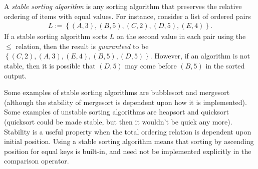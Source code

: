\documentclass[12pt]{article}
\begin{document}

A \emph{stable sorting algorithm} is any sorting algorithm that preserves the relative ordering of items with equal values.  For instance, consider a list of ordered pairs 
\begin{align*}
L := \left\{ (A, 3), (B, 5), (C, 2), (D, 5), (E, 4) \right\}.
\end{align*}
If a stable sorting algorithm sorts $L$ on the second value in each pair using the $\leq$ relation, then the result is \emph{guaranteed} to be
$\left\{ (C, 2), (A, 3), (E, 4), (B, 5), (D, 5) \right\}$.  However, if an algorithm is not stable, then it is possible that $(D, 5)$ may come before $(B, 5)$ in the sorted output.

Some examples of stable sorting algorithms are bubblesort and mergesort (although the stability of mergesort is dependent upon how it is implemented).  Some examples of unstable sorting algorithms are heapsort and quicksort (quicksort could be made stable, but then it wouldn't be quick any more).
Stability is a useful property when the total ordering relation is dependent upon initial position.  Using a stable sorting algorithm means that sorting by ascending position for equal keys is built-in, and need not be implemented explicitly in the comparison operator.
\end{document}
